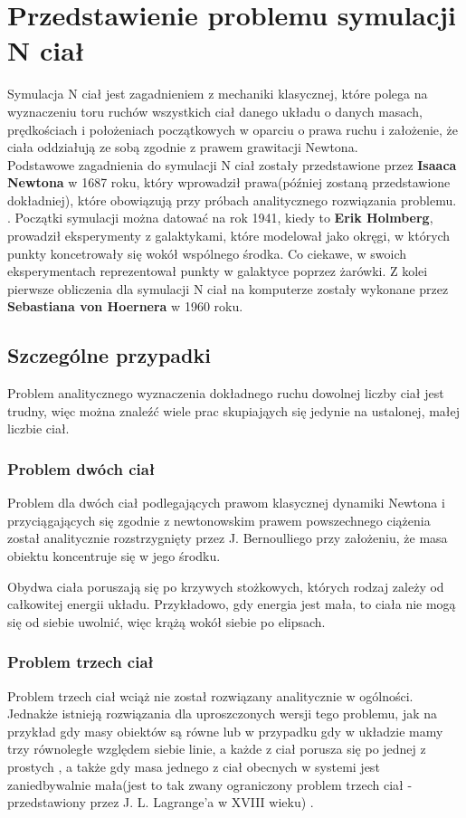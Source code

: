 \documentclass[14pt,twoside,a4paper]{article}
\theoremstyle{definition}
\begin{document}
\section{\LARGE Przedstawienie problemu symulacji N ciał}
\bigskip
Symulacja N ciał jest zagadnieniem z mechaniki klasycznej, które polega na wyznaczeniu toru ruchów wszystkich ciał danego układu o danych masach, prędkościach i położeniach początkowych w oparciu o prawa ruchu i założenie, że ciała oddziałują ze sobą zgodnie z prawem grawitacji Newtona. \\ 
Podstawowe zagadnienia do symulacji N ciał zostały przedstawione przez \textbf{Isaaca Newtona} w 1687 roku, który wprowadził prawa(później zostaną przedstawione dokładniej), które obowiązują przy próbach analitycznego rozwiązania problemu. \cite{Principia}. Początki symulacji można datować na rok 1941, kiedy to \textbf{Erik Holmberg}, prowadził eksperymenty z galaktykami, które modelował jako okręgi, w których punkty koncetrowały się wokół wspólnego środka. Co ciekawe, w swoich eksperymentach reprezentował punkty w galaktyce poprzez żarówki. \cite{holmberg} Z kolei pierwsze obliczenia dla symulacji N ciał na komputerze zostały wykonane przez \textbf{Sebastiana von Hoernera} w 1960 roku. \cite{vonHoerner}

\subsection{\Large Szczególne przypadki}
Problem analitycznego wyznaczenia dokładnego ruchu dowolnej liczby ciał jest trudny, więc można znaleźć wiele prac skupiająych się jedynie na ustalonej, małej liczbie ciał.

\subsubsection{\large Problem dwóch ciał}
Problem dla dwóch ciał podlegających prawom klasycznej dynamiki Newtona i przyciągających się zgodnie z newtonowskim prawem powszechnego ciążenia został analitycznie rozstrzygnięty przez J. Bernoulliego przy założeniu, że masa obiektu koncentruje się w jego środku. \cite[str.~1-49]{fund}

Obydwa ciała poruszają się po krzywych stożkowych, których rodzaj zależy od całkowitej energii układu. Przykładowo, gdy energia jest mała, to ciała nie mogą się od siebie uwolnić, więc krążą wokół siebie po elipsach.

\subsubsection{\large Problem trzech ciał}
Problem trzech ciał wciąż nie został rozwiązany analitycznie w ogólności. Jednakże istnieją rozwiązania dla uproszczonych wersji tego problemu, jak na przykład gdy masy obiektów są równe \cite{threebody1} lub w przypadku gdy w układzie mamy trzy równoległe względem siebie linie, a każde z ciał porusza się po jednej z prostych \cite{threebody2}, a także gdy masa jednego z ciał obecnych w systemi jest zaniedbywalnie mała(jest to tak zwany ograniczony problem trzech ciał - przedstawiony przez J. L. Lagrange'a w XVIII wieku) \cite{szebehely}.
\end{document}
